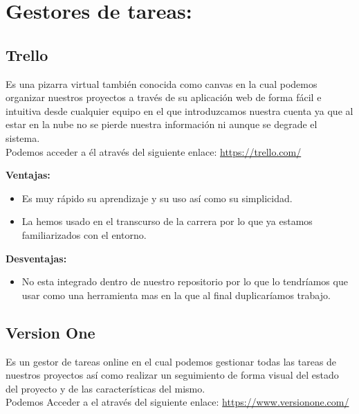 


\section{Gestores de tareas:}
\subsection{Trello}
Es una pizarra virtual también conocida como canvas en la cual podemos organizar nuestros proyectos a través de su aplicación web de forma fácil e intuitiva desde cualquier equipo en el que introduzcamos nuestra cuenta ya que al estar en la nube no se pierde nuestra información ni aunque se degrade el sistema.\\
Podemos acceder a él através del siguiente enlace: 
\url{https://trello.com/}



\textbf{Ventajas:}

\begin{itemize}
\item Es muy rápido su aprendizaje y su uso así como su simplicidad.

\item La hemos usado en el transcurso de la carrera por lo que ya estamos familiarizados con el entorno.
\end{itemize}

\textbf{Desventajas:}

\begin{itemize}
\item No esta integrado dentro de nuestro repositorio por lo que lo tendríamos que usar como una herramienta mas en la que al final duplicaríamos trabajo.
\end{itemize}


\subsection{Version One}
Es un gestor de tareas online en el cual podemos gestionar todas las tareas de nuestros proyectos así como realizar un seguimiento de forma visual del estado del proyecto y de las características del mismo.\\ 
Podemos Acceder a el através del siguiente enlace: 
\url{https://www.versionone.com/}


